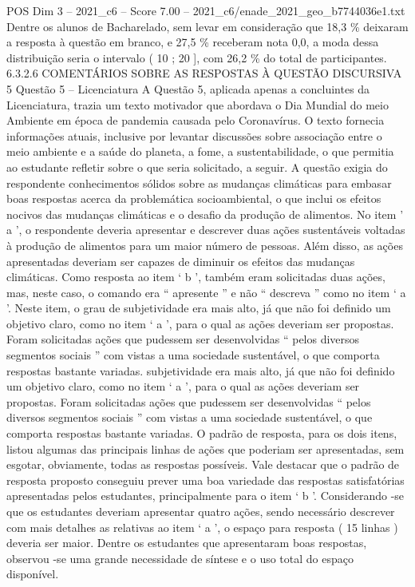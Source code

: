\begin{textsample}{POS Dim 3 – 2021\_c6 – Score 7.00 – 2021\_c6/enade\_2021\_geo\_b7744036e1.txt}
Dentre os alunos de Bacharelado, sem levar em consideração que 18,3 \% deixaram a resposta à questão em branco, e 27,5 \% receberam nota 0,0, a moda dessa distribuição seria o intervalo ( 10 ; 20 ], com 26,2 \% do total de participantes. 6.3.2.6 COMENTÁRIOS SOBRE AS RESPOSTAS À QUESTÃO DISCURSIVA 5 Questão 5 – Licenciatura A Questão 5, aplicada apenas a concluintes da Licenciatura, trazia um texto motivador que abordava o Dia Mundial do meio Ambiente em época de pandemia causada pelo Coronavírus.
O texto fornecia informações atuais, inclusive por levantar discussões sobre associação entre o meio ambiente e a saúde do planeta, a fome, a sustentabilidade, o que permitia ao estudante refletir sobre o que seria solicitado, a seguir.
A questão exigia do respondente conhecimentos sólidos sobre as mudanças climáticas para embasar boas respostas acerca da problemática socioambiental, o que inclui os efeitos nocivos das mudanças climáticas e o desafio da produção de alimentos.
No item ’ a ’, o respondente deveria apresentar e descrever duas ações sustentáveis voltadas à produção de alimentos para um maior número de pessoas.
Além disso, as ações apresentadas deveriam ser capazes de diminuir os efeitos das mudanças climáticas.
Como resposta ao item ‘ b ’, também eram solicitadas duas ações, mas, neste caso, o comando era “ apresente ” e não “ descreva ” como no item ‘ a ’.
Neste item, o grau de subjetividade era mais alto, já que não foi definido um objetivo claro, como no item ‘ a ’, para o qual as ações deveriam ser propostas.
Foram solicitadas ações que pudessem ser desenvolvidas “ pelos diversos segmentos sociais ” com vistas a uma sociedade sustentável, o que comporta respostas bastante variadas. subjetividade era mais alto, já que não foi definido um objetivo claro, como no item ‘ a ’, para o qual as ações deveriam ser propostas.
Foram solicitadas ações que pudessem ser desenvolvidas “ pelos diversos segmentos sociais ” com vistas a uma sociedade sustentável, o que comporta respostas bastante variadas.
O padrão de resposta, para os dois itens, listou algumas das principais linhas de ações que poderiam ser apresentadas, sem esgotar, obviamente, todas as respostas possíveis.
Vale destacar que o padrão de resposta proposto conseguiu prever uma boa variedade das respostas satisfatórias apresentadas pelos estudantes, principalmente para o item ‘ b ’.
Considerando -se que os estudantes deveriam apresentar quatro ações, sendo necessário descrever com mais detalhes as relativas ao item ‘ a ’, o espaço para resposta ( 15 linhas ) deveria ser maior.
Dentre os estudantes que apresentaram boas respostas, observou -se uma grande necessidade de síntese e o uso total do espaço disponível.

\end{textsample}
